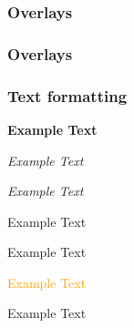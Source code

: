 \documentclass{beamer}
\begin{document}
\begin{frame}
	\frametitle{Overlays}


\end{frame}

\begin{frame}
	\frametitle{Overlays}


\end{frame}


\begin{frame}
	\frametitle{Text formatting}
	\textbf<2>{Example Text}

	\textit<2>{Example Text}

	\textsl<2>{Example Text}

	\textrm<2>{Example Text}

	\textsf<2>{Example Text}

	\textcolor<2>{orange}{Example Text}

	\alert<2>{Example Text}

\end{frame}



\end{document}

